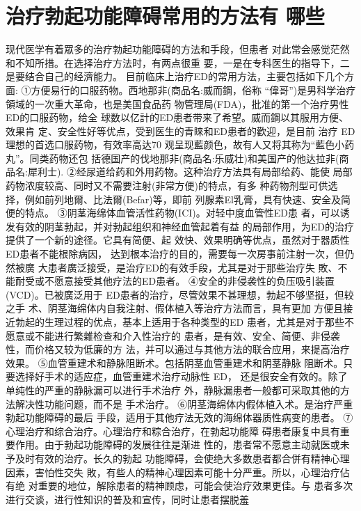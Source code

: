 \documentclass[12pt,UTF8]{ctexbook}
\begin{document}
\section{治疗勃起功能障碍常用的方法有
哪些}
现代医学有着眾多的治疗勃起功能障碍的方法和手段，但患者
对此常会感觉茫然和不知所措。在选择治疗方法时，有两点很重
要，一是在专科医生的指导下，二是要结合自己的经濟能力。
目前临床上治疗ED的常用方法，主要包括如下几个方面:
①方便易行的口服药物。西地那非(商品名:威而鋼，俗称
“偉哥”)是男科学治疗領域的一次重大革命，也是美国食品药
物管理局(FDA)，批准的第一个治疗男性ED的口服药物，给全
球数以亿計的ED患者带来了希望。威而鋼以其服用方便、效果肯
定、安全性好等优点，受到医生的青睐和ED患者的歡迎，是目前
治疗 ED 理想的首选口服药物，有效率高达70%
观呈现藍颜色，故有人又将其称为“藍色小药丸”。同类药物还包
括德国产的伐地那非(商品名:乐威壮)和美国产的他达拉非(商
品名:犀利士).
②经尿道给药和外用药物。这种治疗方法具有局部给药、能使
局部药物浓度较高、同时又不需要注射(非常方便)的特点，有多
种药物剂型可供选择，例如前列地爾、比法爾(Befar)等，即前
列腺素El乳膏，具有快速、安全及简便的特点。
③阴茎海绵体血管活性药物(ICI)。对轻中度血管性ED患
者，可以诱发有效的阴茎勃起，并对勃起组织和神经血管起着有益
的局部作用，为ED的治疗提供了一个新的途径。它具有简便、起
效快、效果明确等优点，虽然对于器质性ED患者不能根除病因，
达到根本治疗的目的，需要每一次房事前注射一次，但仍然被廣
大患者廣泛接受，是治疗ED的有效手段，尤其是对于那些治疗失
敗、不能耐受或不愿意接受其他疗法的ED患者。
④安全的非侵袭性的负压吸引装置(VCD)。已被廣泛用于
ED患者的治疗，尽管效果不甚理想，勃起不够坚挺，但较之手
术、阴茎海绵体内自我注射、假体植入等治疗方法而言，具有更加
方便且接近勃起的生理过程的优点，基本上适用于各种类型的ED
患者，尤其是对于那些不愿意或不能进行繁雜检查和介入性治疗的
患者，是有效、安全、简便、非侵袭性，而价格又较为低廉的方
法，并可以通过与其他方法的联合应用，来提高治疗效果。
⑤血管重建术和静脉阻断术。包括阴茎血管重建术和阴茎静脉
阻断术。只要选择好手术的适应症，血管重建术治疗动脉性 ED，
还是很安全有效的。除了单纯性的严重的静脉漏可以进行手术治疗
外，静脉漏患者一般都可采取其他的方法解决性功能问题，而不是
手术治疗。
⑥阴茎海绵体内假体植入术。是治疗严重勃起功能障碍的最后
手段，适用于其他疗法无效的海绵体器质性病变的患者。
⑦心理治疗和综合治疗。心理治疗和粽合治疗，在勃起功能障
碍患者康复中具有重要作用。由于勃起功能障碍的发展往往是渐进
性的，患者常不愿意主动就医或未予及时有效的治疗。长久的勃起
功能障碍，会使绝大多数患者都合併有精神心理因素，害怕性交失
敗，有些人的精神心理因素可能十分严重。所以，心理治疗佔有绝
对重要的地位，解除患者的精神顾虑，可能会使治疗效果更佳。与
患者多次进行交谈，进行性知识的普及和宣传，同时让患者摆脱羞
\end{document}
